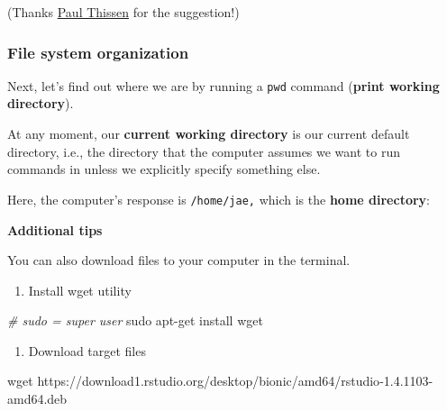 \documentclass[
]{book}
\newenvironment{Shaded}{\begin{snugshade}}{\end{snugshade}}
\newcommand{\CommentTok}[1]{\textcolor[rgb]{0.56,0.35,0.01}{\textit{#1}}}
\newcommand{\ExtensionTok}[1]{#1}
\newcommand{\FunctionTok}[1]{\textcolor[rgb]{0.00,0.00,0.00}{#1}}
\newcommand{\NormalTok}[1]{#1}
\providecommand{\tightlist}{%
  \setlength{\itemsep}{0pt}\setlength{\parskip}{0pt}}
\begin{document}
(Thanks \href{http://www.paulthissen.org/}{Paul Thissen} for the suggestion!)

\hypertarget{file-system-organization}{%
\subsubsection{File system organization}\label{file-system-organization}}

Next, let's find out where we are by running a \texttt{pwd} command (\textbf{print working directory}).

At any moment, our \textbf{current working directory} is our current default directory, i.e., the directory that the computer assumes we want to run commands in unless we explicitly specify something else.

Here, the computer's response is \texttt{/home/jae,} which is the \textbf{home directory}:

\begin{Shaded}
\end{Shaded}

\textbf{Additional tips}

You can also download files to your computer in the terminal.

\begin{enumerate}
\def\labelenumi{\arabic{enumi}.}
\tightlist
\item
  Install wget utility
\end{enumerate}

\begin{Shaded}
\begin{Highlighting}[]
\CommentTok{\# sudo = super user }
\FunctionTok{sudo}\NormalTok{ apt{-}get install wget }
\end{Highlighting}
\end{Shaded}

\begin{enumerate}
\def\labelenumi{\arabic{enumi}.}
\setcounter{enumi}{1}
\tightlist
\item
  Download target files
\end{enumerate}

\begin{Shaded}
\begin{Highlighting}[]
\FunctionTok{wget}\NormalTok{ https://download1.rstudio.org/desktop/bionic/amd64/rstudio{-}1.4.1103{-}amd64.deb}
\end{Highlighting}
\end{Shaded}
\end{document}
